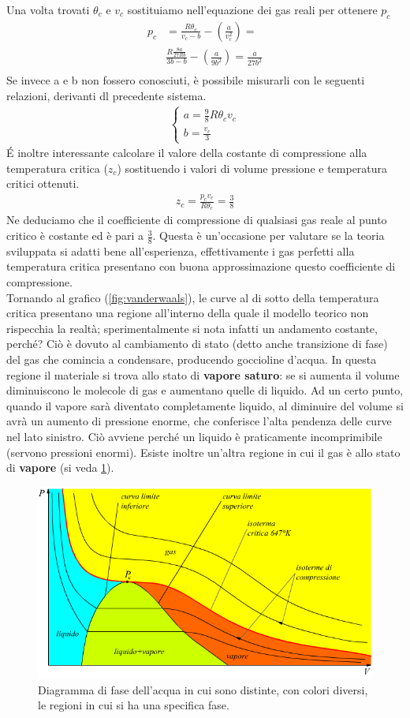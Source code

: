 \documentclass[10pt,a4paper]{article}
\begin{document}
Una volta trovati $\theta_c$ e $v_c$ sostituiamo nell'equazione dei gas reali per ottenere $p_c$
\begin{align*}
	p_c &= \frac{R \theta_c}{v_c - b}-  \left(\frac{a}{v_c^2}\right) = \\
	&\frac{R \frac{8a}{27 R b}}{3b - b}-  \left(\frac{a}{9b^2}\right) = \frac{a}{27 b^2}\\
\end{align*}
Se invece a e b non fossero conosciuti, è possibile misurarli con le seguenti relazioni, derivanti dl precedente sistema. 
\begin{align*}
\begin{cases}
a = \frac{9}{8} R \theta_c v_c\\
b = \frac{v_c}{3}
\end{cases}
\end{align*}
\'{E} inoltre interessante calcolare il valore della costante di compressione alla temperatura critica ($z_c$) sostituendo i valori di volume pressione e temperatura critici ottenuti. 
\begin{align*}
z_c = \frac{p_c v_c }{R \theta_c} = \frac{3}{8}
\end{align*}
Ne deduciamo che il coefficiente di compressione di qualsiasi gas reale al punto critico è costante ed è pari a $\frac{3}{8}$. Questa è un'occasione per valutare se la teoria sviluppata si adatti bene all'esperienza, effettivamente i gas perfetti alla temperatura critica presentano con buona approssimazione questo coefficiente di compressione.\\
Tornando al grafico (\ref{fig:vanderwaals}), le curve al di sotto della temperatura critica presentano una regione all'interno della quale il modello teorico non rispecchia la realtà; sperimentalmente si nota infatti un andamento costante, perché? Ciò è dovuto al cambiamento di stato (detto anche transizione di fase) del gas che comincia a condensare, producendo goccioline d'acqua. In questa regione il materiale si trova allo stato di \textbf{vapore saturo}: se si aumenta il volume diminuiscono le molecole di gas e aumentano quelle di liquido. Ad un certo punto, quando il vapore sarà diventato completamente liquido, al diminuire del volume si avrà un aumento di pressione enorme, che conferisce l'alta pendenza delle curve nel lato sinistro. Ciò avviene perché un liquido è praticamente incomprimibile (servono pressioni enormi). Esiste inoltre un'altra regione in cui il gas è allo stato di \textbf{vapore} (si veda \ref{fig:diagramma-di-fase}). 
\begin{figure}[h!]
	\centering
	\includegraphics[width=0.6\linewidth]{"diagramma di fase"}
	\caption{Diagramma di fase dell'acqua in cui sono distinte, con colori diversi, le regioni in cui si ha una specifica fase.}
	\label{fig:diagramma-di-fase}
\end{figure}
\end{document}
